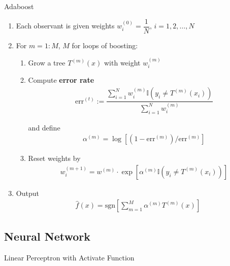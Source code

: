 \begin{algorithm}{Adaboost}
    \begin{enumerate}[topsep=2pt,itemsep=2pt]
        \item Each observant is given weights $ w_i^{(0)}=\dfrac{1}{N},\,i=1,2,\ldots,N $
        \item For $ m=1:M $, $ M $ for loops of boosting:
        \begin{enumerate}[topsep=2pt,itemsep=2pt]
            \item Grow a tree $ T^{(m)}(x) $ with weight $ w_i^{(m)} $
            \item Compute \textbf{error rate}
            \begin{align}
                \mathrm{err}^{(t)} :=\dfrac{\sum_{i=1}^Nw_i^{(m)}\mathbb{I}(y_i\neq T^{(m)}(x_i))}{\sum_{i=1}^Nw_i^{(m)}}
            \end{align}

            and define 
            \begin{align}
                 \alpha ^{(m)}=\log\left[(1-\mathrm{err}^{(m)} )\big/\mathrm{err}^{(m)}\right]
            \end{align}
            \item Reset weights by
            \begin{align}
                w_i ^{(m+1)}=w^{(m)}\cdot\exp\left[ \alpha ^{(m)}\mathbb{I}(y_i\neq T^{(m)}(x_i)) \right]
            \end{align}
         
        \end{enumerate}
        \item Output
        \begin{align}
            \hat{f}(x)=\mathrm{sgn}\left[\sum_{m=1}^M\alpha ^{(m)}T^{(m)}(x)\right]  
        \end{align}
        
        
            
    \end{enumerate}
    
        
\end{algorithm}
    

\subsection{Neural Network}
\begin{point}
    Linear Perceptron with Activate Function
\end{point}

